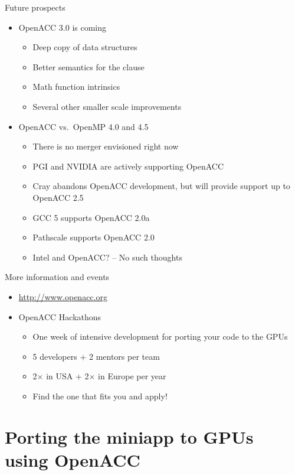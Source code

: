 \documentclass[12pt,aspectratio=169]{beamer}
\begin{document}
\begin{frame}{Future prospects}
  \begin{itemize}
  \item OpenACC 3.0 is coming
    \begin{itemize}
    \item Deep copy of data structures
    \item Better semantics for the  clause
    \item Math function intrinsics
    \item Several other smaller scale improvements
    \end{itemize}
  \item OpenACC vs.\ OpenMP 4.0 and 4.5
    \begin{itemize}
    \item There is no merger envisioned right now
    \item PGI and NVIDIA are actively supporting OpenACC
    \item Cray abandons OpenACC development, but will provide support up to
      OpenACC 2.5
    \item GCC 5 supports OpenACC 2.0a
    \item Pathscale supports OpenACC 2.0
    \item Intel and OpenACC? -- No such thoughts
    \end{itemize}
  \end{itemize}
\end{frame}

\begin{frame}{More information and events}
  \begin{itemize}
  \item \url{http://www.openacc.org}
  \item OpenACC Hackathons
    \begin{itemize}
    \item One week of intensive development for porting your code to the GPUs
    \item 5 developers + 2 mentors per team
    \item 2$\times$ in USA + 2$\times$ in Europe per year
    \item Find the one that fits you and apply!
    \end{itemize}
  \end{itemize}
\end{frame}

\part{Porting the miniapp to GPUs using OpenACC}
\end{document}
